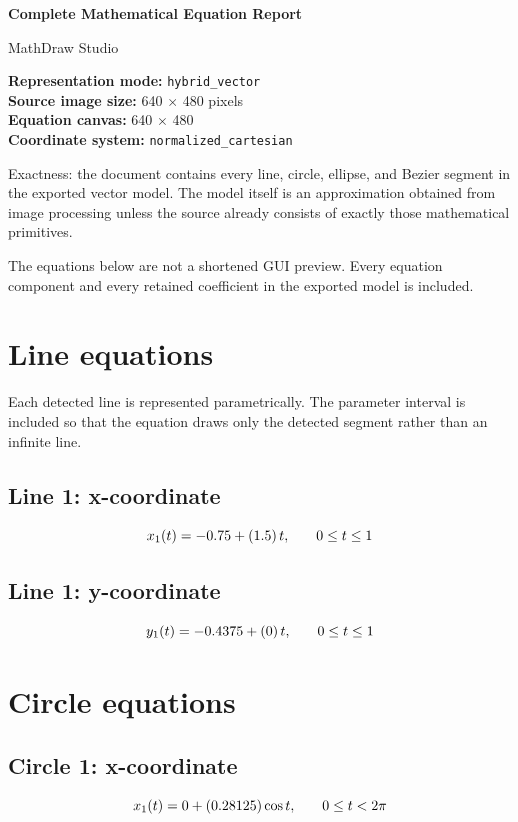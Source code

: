 \documentclass[10pt]{article}
\begin{document}
\begin{center}
{\LARGE\bfseries Complete Mathematical Equation Report}\par
\vspace{3pt}
{\large MathDraw Studio}\par
\end{center}
\textbf{Representation mode:} \texttt{hybrid\_vector}\\
\textbf{Source image size:} 640 $\times$ 480 pixels\\
\textbf{Equation canvas:} 640 $\times$ 480\\
\textbf{Coordinate system:} \texttt{normalized\_cartesian}

Exactness: the document contains every line, circle, ellipse, and Bezier segment in the exported vector model. The model itself is an approximation obtained from image processing unless the source already consists of exactly those mathematical primitives.

The equations below are not a shortened GUI preview. Every equation component and every retained coefficient in the exported model is included.
\section{Line equations}
Each detected line is represented parametrically. The parameter interval is included so that the equation draws only the detected segment rather than an infinite line.
\subsection*{Line 1: x-coordinate}
\begin{equation*}
\small
x_{1}(t)=-0.75+\left(1.5\right)t,\qquad 0\le t\le 1
\end{equation*}
\subsection*{Line 1: y-coordinate}
\begin{equation*}
\small
y_{1}(t)=-0.4375+\left(0\right)t,\qquad 0\le t\le 1
\end{equation*}
\section{Circle equations}
\subsection*{Circle 1: x-coordinate}
\begin{equation*}
\small
x_{1}(t)=0+\left(0.28125\right)\cos t,\qquad 0\le t<2\pi
\end{equation*}
\end{document}

